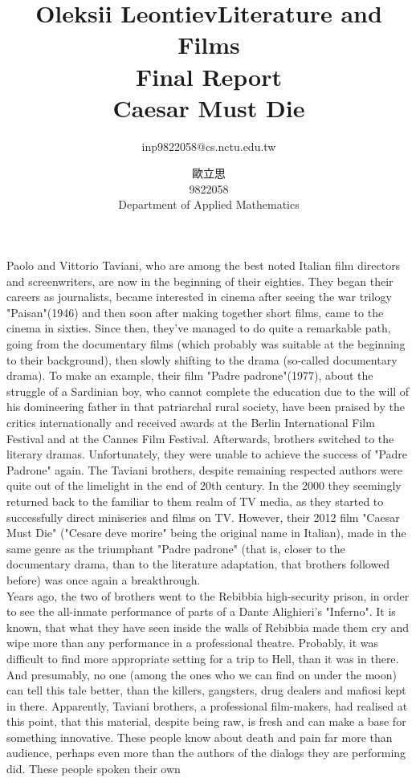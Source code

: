 \documentclass[10pt]{article}
\title{\bfseries\Huge Oleksii Leontiev}
\author{inp9822058@cs.nctu.edu.tw}
\date{}
\title{Literature and Films\\Final Report\\Caesar Must Die}
\author{歐立思\\9822058\\Department of Applied Mathematics}
\begin{document}
\maketitle
Paolo and Vittorio Taviani, who are among the best noted Italian film directors and screenwriters, are now in the beginning of their eighties. They began their careers as journalists, became interested in cinema after seeing
the war trilogy "Paisan"(1946) and then soon after making together short films, came to the cinema in sixties. Since then,
they've managed to do quite a remarkable path, going from the documentary films (which probably was suitable at the beginning to their background), then slowly shifting to the drama (so-called documentary drama).
To make an example, their film "Padre padrone"(1977), about the struggle of a Sardinian boy, who cannot complete the education due to the will of his domineering father in that patriarchal rural society, have been praised by the critics
internationally and received awards at the Berlin International Film Festival and at the Cannes Film Festival. Afterwards, brothers switched to the literary dramas. Unfortunately, they were unable to achieve the success of "Padre
Padrone" again. The Taviani brothers, despite remaining respected authors were quite out of the limelight in the end of 20th century. In the 2000 they seemingly returned back to the familiar to them realm of TV media, as they started
to successfully direct miniseries and films on TV. However, their 2012 film "Caesar Must Die" ("Cesare deve morire" being the original name in Italian),
made in the same genre as the triumphant "Padre padrone" (that is, closer to the documentary drama, than
to the literature adaptation, that brothers followed before) was once again a breakthrough.\\
Years ago, the two of brothers went to the Rebibbia high-security prison, in order to see the all-inmate performance of parts of a Dante Alighieri's "Inferno". It is known, that what they have seen inside the walls of Rebibbia made
them cry and wipe more than any performance in a professional theatre. Probably, it was difficult to find more appropriate setting for a trip to Hell, than it was in there. And presumably, no one (among the ones who we can find on
under the moon) can tell this tale better, than the killers, gangsters, drug dealers and mafiosi kept in there. Apparently, Taviani brothers, a professional film-makers, had realised at this point, that this material, despite being raw,
is fresh and can make a base for something innovative. These people know about death and pain far more than audience, perhaps even more than the authors of the dialogs they are performing did. These people spoken their own
\end{document}
